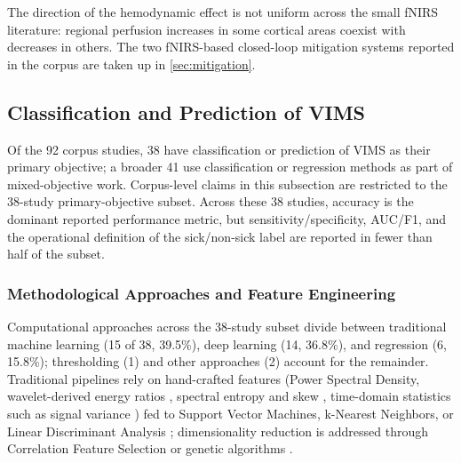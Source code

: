 The direction of the hemodynamic effect is not uniform across the small fNIRS literature: regional perfusion increases in some cortical areas coexist with decreases in others.
The two fNIRS-based closed-loop mitigation systems reported in the corpus \cite{yamamuraHemodynamicVRAdaptingUsers2021, yamamuraPleasantLocomotionReducing2020} are taken up in \autoref{sec:mitigation}.


\subsection{Classification and Prediction of VIMS}\label{sec:classification}

Of the 92 corpus studies, 38 have classification or prediction of VIMS as their primary objective; a broader 41 use classification or regression methods as part of mixed-objective work.
Corpus-level claims in this subsection are restricted to the 38-study primary-objective subset.
Across these 38 studies, accuracy is the dominant reported performance metric, but sensitivity/specificity, AUC/F1, and the operational definition of the sick/non-sick label are reported in fewer than half of the subset.

\subsubsection{Methodological Approaches and Feature Engineering}
Computational approaches across the 38-study subset divide between traditional machine learning (15 of 38, 39.5\%), deep learning (14, 36.8\%), and regression (6, 15.8\%); thresholding (1) and other approaches (2) account for the remainder.
Traditional pipelines rely on hand-crafted features (Power Spectral Density, wavelet-derived energy ratios \cite{liVRMotionSickness2020}, spectral entropy and skew \cite{fengComprehensiveExplorationMotion2025}, time-domain statistics such as signal variance \cite{mawalidClassificationEEGSignal2018}) fed to Support Vector Machines, k-Nearest Neighbors, or Linear Discriminant Analysis \cite{yuEEGbasedClassificationSystem2010, chaiEEGStudyVirtual2023}; dimensionality reduction is addressed through Correlation Feature Selection \cite{khoirunnisaaChannelSelectionEEGBased2018} or genetic algorithms \cite{weiGeneticFeatureSelection2011}.

